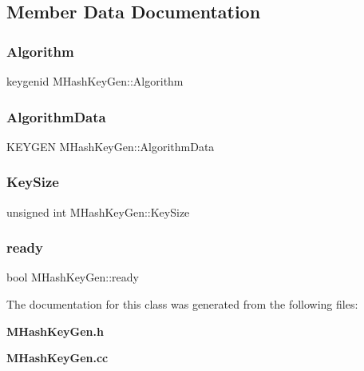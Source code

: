 \subsection{Member Data Documentation}
\mbox{\label{classMHashKeyGen_a02555544aabc2ee67796b29b4c2e2fa2}} 
\subsubsection{Algorithm}
{\footnotesize\ttfamily keygenid M\+Hash\+Key\+Gen\+::\+Algorithm\hspace{0.3cm}{\ttfamily [private]}}

\mbox{\label{classMHashKeyGen_a2983042aa752b477e867ae694c44e020}} 
\subsubsection{Algorithm\+Data}
{\footnotesize\ttfamily K\+E\+Y\+G\+EN M\+Hash\+Key\+Gen\+::\+Algorithm\+Data\hspace{0.3cm}{\ttfamily [private]}}

\mbox{\label{classMHashKeyGen_a339c55fa387f746241004036c7119524}} 
\subsubsection{Key\+Size}
{\footnotesize\ttfamily unsigned int M\+Hash\+Key\+Gen\+::\+Key\+Size\hspace{0.3cm}{\ttfamily [private]}}

\mbox{\label{classMHashKeyGen_ab6b00edfe8982171fb991ef527256bde}} 
\subsubsection{ready}
{\footnotesize\ttfamily bool M\+Hash\+Key\+Gen\+::ready\hspace{0.3cm}{\ttfamily [private]}}



The documentation for this class was generated from the following files\+:\begin{DoxyCompactItemize}
\item 
\textbf{ M\+Hash\+Key\+Gen.\+h}\item 
\textbf{ M\+Hash\+Key\+Gen.\+cc}\end{DoxyCompactItemize}
